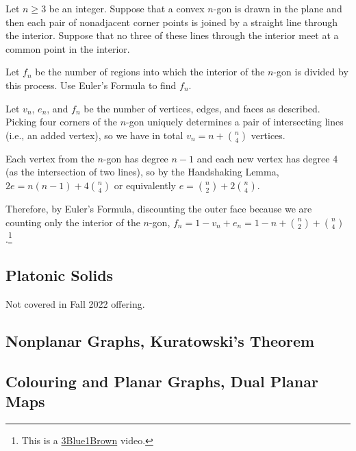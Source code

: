 \begin{xca}
  Let $n \geq 3$ be an integer.
  Suppose that a convex $n$-gon is drawn in the plane
  and then each pair of nonadjacent corner points
  is joined by a straight line through the interior.
  Suppose that no three of these lines through the interior
  meet at a common point in the interior.

  Let $f_n$ be the number of regions into which
  the interior of the $n$-gon is divided by this process.
  Use Euler's Formula to find $f_n$.
\end{xca}
\begin{sol}
  Let $v_n$, $e_n$, and $f_n$ be the number of vertices, edges, and faces as described.
  Picking four corners of the $n$-gon uniquely determines
  a pair of intersecting lines (i.e., an added vertex),
  so we have in total $v_n = n + \binom{n}{4}$ vertices.

  Each vertex from the $n$-gon has degree $n-1$
  and each new vertex has degree 4 (as the intersection of two lines),
  so by the Handshaking Lemma, $2e = n(n-1) + 4\binom{n}{4}$
  or equivalently $e = \binom{n}{2} + 2\binom{n}{4}$.

  Therefore, by Euler's Formula, discounting the outer face because
  we are counting only the interior of the $n$-gon, $f_n = 1 - v_n + e_n
    = 1 - n + \binom{n}{2} + \binom{n}{4}$.\footnote{This is a \href{https://www.youtube.com/watch?v=K8P8uFahAgc}{3Blue1Brown} video.}
\end{sol}

\subsection{Platonic Solids}

Not covered in Fall 2022 offering.

\setcounter{subsection}{5}
\subsection{Nonplanar Graphs, Kuratowski's Theorem}

\setcounter{subsection}{7}
\subsection{Colouring and Planar Graphs, Dual Planar Maps}
